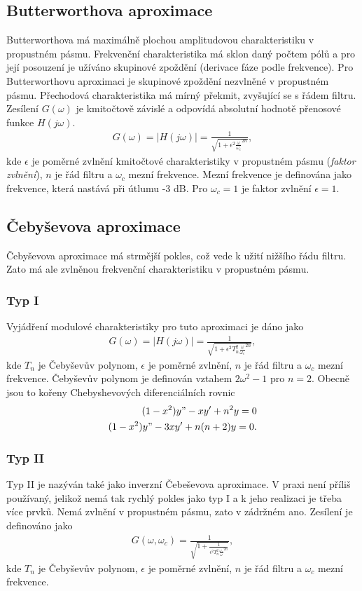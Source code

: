 \documentclass[twoside]{article}
\begin{document}
\subsection{Butterworthova aproximace}
Butterworthova má maximálně plochou amplitudovou charakteristiku v propustném pásmu. Frekvenční charakteristika má sklon daný počtem pólů a pro její posouzení je užíváno skupinové zpoždění (derivace fáze podle frekvence). Pro Butterworthovu aproximaci je skupinové zpoždění nezvlněné v propustném pásmu. Přechodová charakteristika má mírný překmit, zvyšující se s řádem filtru. Zesílení $G(\omega)$ je kmitočtově závislé a odpovídá absolutní hodnotě přenosové funkce $H(j\omega)$.
\begin{align}
G(\omega) = |H(j\omega)| = \frac{1}{\sqrt{1 + \epsilon ^2 \frac{\omega}{\omega _c}^{2n}}},
\end{align}
kde $\epsilon$ je poměrné zvlnění kmitočtové charakteristiky v propustném pásmu (\textit{faktor zvlnění}), $n$ je řád filtru a $\omega _c$ mezní frekvence. Mezní frekvence je definována jako frekvence, která nastává při útlumu -3 dB. Pro $\omega _c = 1$ je faktor zvlnění $\epsilon = 1$. 
\subsection{Čebyševova aproximace}
Čebyševova aproximace má strmější pokles, což vede k užití nižšího řádu filtru. Zato má ale zvlněnou frekvenční charakteristiku v propustném pásmu. 
\subsubsection{Typ I}
Vyjádření modulové charakteristiky pro tuto aproximaci je dáno jako
\begin{align}
G(\omega) = |H(j\omega)| = \frac{1}{\sqrt{1 + \epsilon ^2 T_n ^2 \frac{\omega}{\omega _c}^{2n}}},
\end{align}
kde $T_n$ je Čebyševův polynom, $\epsilon$ je poměrné zvlnění, $n$ je řád filtru a $\omega _c$ mezní frekvence. Čebyševův polynom je definován vztahem $2 \omega ^2 - 1$ pro $n = 2$. Obecně jsou to kořeny Chebyshevových diferenciálních rovnic
\begin{align}
(1 - x^2)y" - xy' + n^2y = 0\\
(1 - x^2)y" - 3xy' + n(n+2)y = 0.
\end{align}
\subsubsection{Typ II}
Typ II je nazýván také jako inverzní Čebeševova aproximace. V praxi není příliš používaný, jelikož nemá tak rychlý pokles jako typ I a k jeho realizaci je třeba více prvků. Nemá zvlnění v propustném pásmu, zato v zádržném ano. Zesílení je definováno jako
\begin{align}
G(\omega, \omega _c) = \frac{1}{\sqrt{1 + \frac{1}{\epsilon ^2 T_n ^2 \frac{\omega _c}{\omega}^{2n}}}},
\end{align}
kde $T_n$ je Čebyševův polynom, $\epsilon$ je poměrné zvlnění, $n$ je řád filtru a $\omega _c$ mezní frekvence.
\end{document}

